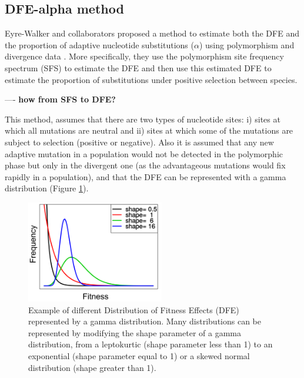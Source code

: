 \subsection{DFE-alpha method} \label{alpha}

Eyre-Walker and collaborators proposed a method to estimate both the DFE and the proportion of adaptive nucleotide substitutions ($\alpha$) using polymorphism and divergence data \citep{Eyre-Walker2009}.
More specifically, they use the polymorphism site frequency spectrum (SFS) to estimate the DFE and then use this estimated DFE to estimate the proportion of substitutions under positive selection between species.
	
---- \textbf{how from SFS to DFE?}

This method, assumes that there are two types of nucleotide sites: 
i) sites at which all mutations are neutral and ii) sites at which some of the mutations are subject to selection (positive or negative).
Also it is assumed that any new adaptive mutation in a population would not be detected in the polymorphic phase but only in the divergent one (as the advantageous mutations would fix rapidly in a population), and that the DFE can be represented with a gamma distribution (Figure \ref{fig:Gamma}).

\begin{figure}[h]
  \includegraphics[width=6cm]{./Images/Gamma_dist_2.png}
  \centering
  \caption{Example of different Distribution of Fitness Effects (DFE) represented by a gamma distribution. Many distributions can be represented by modifying the shape parameter of a gamma distribution, from a leptokurtic (shape parameter less than 1) to an exponential (shape parameter equal to 1) or a skewed normal distribution (shape  greater than 1).
   }
  \label{fig:Gamma}
\end{figure}

